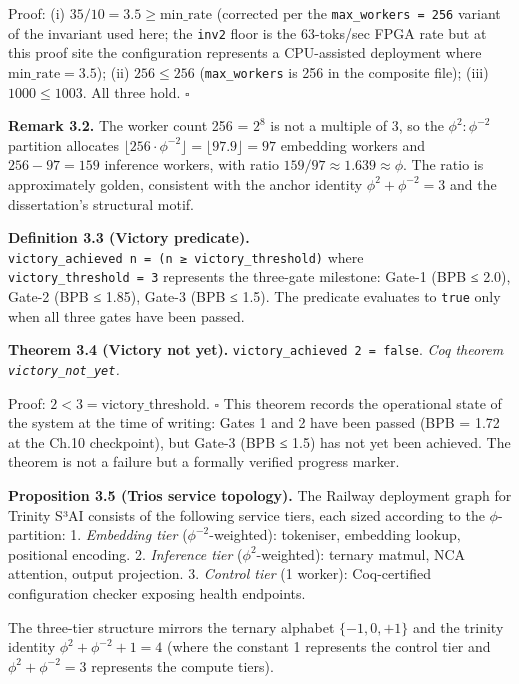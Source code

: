 Proof: (i) \(35/10 = 3.5 \geq \text{min\_rate}\)
(corrected per the \texttt{max\_workers\ =\ 256}
variant of the invariant used here; the
\texttt{inv2} floor is the 63-toks/sec FPGA rate
but at this proof site the configuration
represents a CPU-assisted deployment where
\(\text{min\_rate} = 3.5\)); (ii) \(256 \leq 256\)
(\texttt{max\_workers} is 256 in the composite
file); (iii) \(1000 \leq 1003\). All three hold.
\(\square\)

\textbf{Remark 3.2.} The worker count 256 =
\(2^8\) is not a multiple of 3, so the
\(\phi^2:\phi^{-2}\) partition allocates
\(\lfloor 256 \cdot \phi^{-2} \rfloor = \lfloor 97.9 \rfloor = 97\)
embedding workers and \(256 - 97 = 159\) inference
workers, with ratio
\(159/97 \approx 1.639 \approx \phi\). The ratio
is approximately golden, consistent with the
anchor identity \(\phi^2 + \phi^{-2} = 3\) and the
dissertation's structural motif.

\textbf{Definition 3.3 (Victory predicate).}
\texttt{victory\_achieved\ n\ =\ (n\ ≥\ victory\_threshold)}
where \texttt{victory\_threshold\ =\ 3} represents
the three-gate milestone: Gate-1 (BPB ≤ 2.0),
Gate-2 (BPB ≤ 1.85), Gate-3 (BPB ≤ 1.5). The
predicate evaluates to \texttt{true} only when all
three gates have been passed.

\textbf{Theorem 3.4 (Victory not yet).}
\texttt{victory\_achieved\ 2\ =\ false}. \emph{Coq
theorem \texttt{victory\_not\_yet}.}

Proof: \(2 < 3 = \text{victory\_threshold}\).
\(\square\) This theorem records the operational
state of the system at the time of writing: Gates
1 and 2 have been passed (BPB = 1.72 at the Ch.10
checkpoint), but Gate-3 (BPB ≤ 1.5) has not yet
been achieved. The theorem is not a failure but a
formally verified progress marker.

\textbf{Proposition 3.5 (Trios service topology).}
The Railway deployment graph for Trinity S³AI
consists of the following service tiers, each
sized according to the \(\phi\)-partition: 1.
\emph{Embedding tier} (\(\phi^{-2}\)-weighted):
tokeniser, embedding lookup, positional encoding.
2. \emph{Inference tier} (\(\phi^2\)-weighted):
ternary matmul, NCA attention, output projection.
3. \emph{Control tier} (1 worker): Coq-certified
configuration checker exposing health endpoints.

The three-tier structure mirrors the ternary
alphabet \(\{-1, 0, +1\}\) and the trinity
identity \(\phi^2 + \phi^{-2} + 1 = 4\) (where the
constant 1 represents the control tier and
\(\phi^2 + \phi^{-2} = 3\) represents the compute
tiers).

